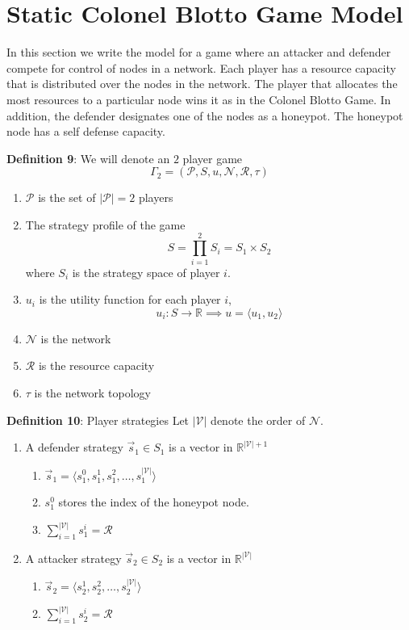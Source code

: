\documentclass[conference]{IEEEtran}
\begin{document}
\section{Static Colonel Blotto Game Model}

In this section we write the model for a game where an attacker and defender compete for control of nodes in a network. Each player has a resource capacity  that is distributed over the nodes in the network. The player that allocates the most resources to a particular node wins it as in the Colonel Blotto Game. In addition, the defender designates one of the nodes as a honeypot. The honeypot node has a self defense capacity.

\textbf{Definition 9}: We will denote an $2$ player game $$\Gamma_2 = (\mathcal{P}, S, u, \mathcal{N}, \mathcal{R}, \tau)$$
\begin{enumerate}
\item $\mathcal{P}$ is the set of $|\mathcal{P}| = 2$ players
\item The strategy profile of the game $$S = \displaystyle \prod_{i = 1}^2 S_i = S_1 \times S_2$$ where $S_i$ is the strategy space of player $i$.
\item $u_i$ is the utility function for each player $i$, $$u_i \mathpunct{:} S \to \mathbb{R} \implies u = \langle u_1, u_2 \rangle$$
\item $\mathcal{N}$ is the network
\item $\mathcal{R}$ is the resource capacity
\item $\tau$ is the network topology
\end{enumerate}


\textbf{Definition 10}: Player strategies
Let $|\mathcal{V}|$ denote the order of $\mathcal{N}$.
\begin{enumerate}
\item A defender strategy $\vec{s}_1 \in S_1$ is a vector in $\mathbb{R}^{|\mathcal{V}| + 1}$
\begin{enumerate}
\item $\vec{s}_1 = \langle s_1^0, s_1^1, s_1^2, \ldots, s_1^{|\mathcal{V}|} \rangle$
\item $s_1^0$ stores the index of the honeypot node.
\item $\displaystyle \sum_{i = 1}^{|\mathcal{V}|} s_1^i = \mathcal{R}$
\end{enumerate}
\item A attacker strategy $\vec{s}_2 \in S_2$ is a vector in $\mathbb{R}^{|\mathcal{V}|}$
\begin{enumerate}
\item $\vec{s}_2 = \langle s_2^1, s_2^2, \ldots, s_2^{|\mathcal{V}|} \rangle$
\item $\displaystyle \sum_{i = 1}^{|\mathcal{V}|} s_2^i = \mathcal{R}$
\end{enumerate}
\end{enumerate}
\end{document}
